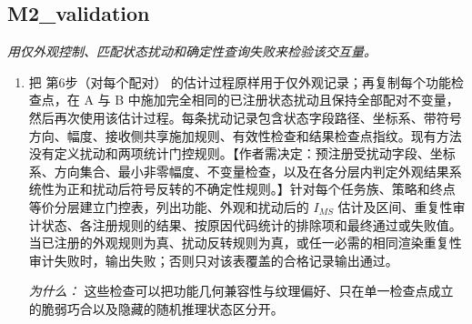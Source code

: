 \documentclass[10pt,a4paper]{article}
\begin{document}
\subsection*{M2\_validation}
\emph{用仅外观控制、匹配状态扰动和确定性查询失败来检验该交互量。}
\begin{enumerate}[leftmargin=*,start=7]
  \item 把 第6步（对每个配对） 的估计过程原样用于仅外观记录；再复制每个功能检查点，在 A 与 B 中施加完全相同的已注册状态扰动且保持全部配对不变量，然后再次使用该估计过程。每条扰动记录包含状态字段路径、坐标系、带符号方向、幅度、接收侧共享施加规则、有效性检查和结果检查点指纹。现有方法没有定义扰动和两项统计门控规则。【作者需决定：预注册受扰动字段、坐标系、方向集合、最小非零幅度、不变量检查，以及在各分层内判定外观结果系统性为正和扰动后符号反转的不确定性规则。】针对每个任务族、策略和终点等价分层建立门控表，列出功能、外观和扰动后的 \(I_{MS}\) 估计及区间、重复性审计状态、各注册规则的结果、按原因代码统计的排除项和最终通过或失败值。当已注册的外观规则为真、扰动反转规则为真，或任一必需的相同渲染重复性审计失败时，输出失败；否则只对该表覆盖的合格记录输出通过。
\par\emph{为什么：} 这些检查可以把功能几何兼容性与纹理偏好、只在单一检查点成立的脆弱巧合以及隐藏的随机推理状态区分开。
\end{enumerate}
\end{document}

